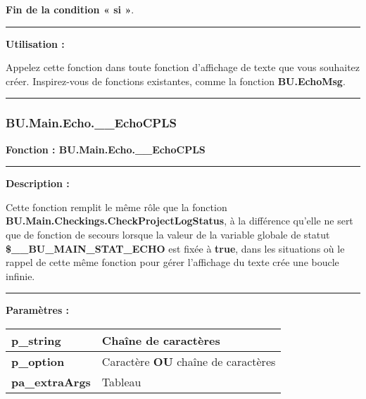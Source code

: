 \documentclass[a4paper,10pt]{article}
\begin{document}
\begin{justify}
    \textbf{\color{cond}Fin de la condition « si »}.
\end{justify}


\par\noindent\rule{\textwidth}{0.4pt}

\begin{justify}
    \textbf{Utilisation :}

    Appelez cette fonction dans toute fonction d'affichage de texte que vous souhaitez créer. Inspirez-vous de fonctions existantes, comme la fonction \textbf{\color{func}BU.EchoMsg}.
\end{justify}



\color{sec3}\par\noindent\rule{\textwidth}{0.4pt}\color{text}

\color{sec3}
\subsubsection{BU.Main.Echo.\_\_EchoCPLS}\color{text}

\begin{justify}
    \textbf{Fonction : \color{func}BU.Main.Echo.\_\_EchoCPLS}
\end{justify}


\par\noindent\rule{\textwidth}{0.4pt}

\begin{justify}
    \textbf{Description :}

    Cette fonction remplit le même rôle que la fonction \textbf{\color{func}BU.Main.Checkings.CheckProjectLogStatus}, à la différence qu'elle ne sert que de fonction de secours lorsque la valeur de la variable globale de statut \textbf{\color{vars}\$\_\_BU\_MAIN\_STAT\_ECHO} est fixée à \textbf{true}, dans les situations où le rappel de cette même fonction pour gérer l'affichage du texte crée une boucle infinie.
\end{justify}


\par\noindent\rule{\textwidth}{0.4pt}

\begin{justify}
    \textbf{Paramètres :}

    \begin{tabular}{|l|l|}
        \hline
        \textbf{\color{vars}p\_string} & Chaîne de caractères\\
        \hline
        \textbf{\color{vars}p\_option} & Caractère \textbf{OU} chaîne de caractères\\
        \hline
        \textbf{\color{vars}pa\_extraArgs} & Tableau\\
        \hline
    \end{tabular}
\end{justify}
\end{document}
